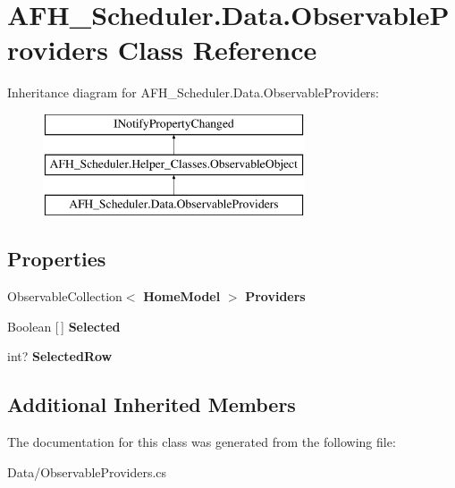 \section{A\+F\+H\+\_\+\+Scheduler.\+Data.\+Observable\+Providers Class Reference}
\label{class_a_f_h___scheduler_1_1_data_1_1_observable_providers}
Inheritance diagram for A\+F\+H\+\_\+\+Scheduler.\+Data.\+Observable\+Providers\+:\begin{figure}[H]
\begin{center}
\leavevmode
\includegraphics[height=3.000000cm]{class_a_f_h___scheduler_1_1_data_1_1_observable_providers}
\end{center}
\end{figure}
\subsection*{Properties}
\begin{DoxyCompactItemize}
\item 
\mbox{\label{class_a_f_h___scheduler_1_1_data_1_1_observable_providers_a691ecf16e365be6479a486f0347c59bf}} 
Observable\+Collection$<$ \textbf{ Home\+Model} $>$ {\bfseries Providers}\hspace{0.3cm}{\ttfamily  [get, set]}
\item 
\mbox{\label{class_a_f_h___scheduler_1_1_data_1_1_observable_providers_a7a97ab7e3f0347ce51dc7ab18b70baab}} 
Boolean [$\,$] {\bfseries Selected}\hspace{0.3cm}{\ttfamily  [get, set]}
\item 
\mbox{\label{class_a_f_h___scheduler_1_1_data_1_1_observable_providers_a16d00215a65e6072113779397e18f82e}} 
int? {\bfseries Selected\+Row}\hspace{0.3cm}{\ttfamily  [get, set]}
\end{DoxyCompactItemize}
\subsection*{Additional Inherited Members}


The documentation for this class was generated from the following file\+:\begin{DoxyCompactItemize}
\item 
Data/Observable\+Providers.\+cs\end{DoxyCompactItemize}
